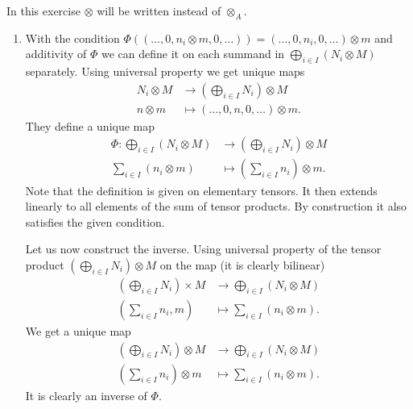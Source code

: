\begin{exercise}{3}
    In this exercise $\otimes$ will be written instead of $\otimes_A$.
    \begin{enumerate}
        \item With the condition $\Phi((\ldots, 0, n_i \otimes m, 0, \ldots)) =
            (\ldots, 0, n_i, 0, \ldots) \otimes m$ and additivity of $\Phi$ we
            can define it on each summand in $\bigoplus_{i \in I} (N_i \otimes
            M)$ separately. Using universal property we get unique maps
            \begin{align*}
                N_i \otimes M &\rightarrow (\bigoplus_{i \in I} N_i) \otimes M
                \\
                n \otimes m &\mapsto (\ldots, 0, n, 0, \ldots) \otimes m.
            \end{align*}
            They define a unique map
            \begin{align*}
                \Phi \colon \bigoplus_{i \in I} (N_i \otimes M) &\rightarrow
                (\bigoplus_{i \in I} N_i) \otimes M \\
                \sum_{i \in I} (n_i \otimes m) &\mapsto (\sum_{i \in I} n_i)
                \otimes m.
            \end{align*}
            Note that the definition is given on elementary tensors. It then
            extends linearly to all elements of the sum of tensor products. By
            construction it also satisfies the given condition.

            Let us now construct the inverse. Using universal property of the
            tensor product $(\bigoplus_{i \in I} N_i) \otimes M$ on the map
            (it is clearly bilinear)
            \begin{align*}
                (\bigoplus_{i \in I} N_i) \times M &\rightarrow \bigoplus_{i \in
                I} (N_i \otimes M) \\
                (\sum_{i \in I} n_i, m) &\mapsto \sum_{i \in I} (n_i \otimes m).
            \end{align*}
            We get a unique map
            \begin{align*}
                (\bigoplus_{i \in I} N_i) \otimes M &\rightarrow \bigoplus_{i
                \in I} (N_i \otimes M) \\
                (\sum_{i \in I} n_i) \otimes m &\mapsto \sum_{i \in I} (n_i
                \otimes m).
            \end{align*}
            It is clearly an inverse of $\Phi$.


\end{enumerate}
\end{exercise}
